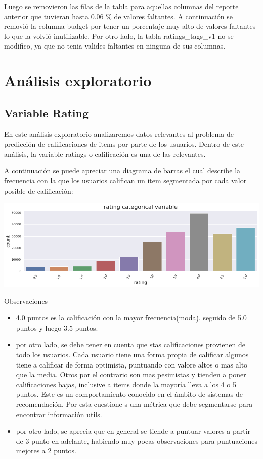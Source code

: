 \documentclass[11pt,a4paper,twoside]{thesis}
\begin{document}
Luego se removieron las filas de la tabla para aquellas columnas del reporte anterior que tuvieran hasta 0.06 \% de valores faltantes. A continuación se removió la columna budget por tener un porcentaje muy alto de valores faltantes lo que la volvió inutilizable. Por otro lado, la tabla ratings\_tags\_v1 no se modifico, ya que no tenia valides faltantes en ninguna de sus columnas.


\clearpage
\section{Análisis exploratorio}


\subsection{Variable Rating}


En este análisis exploratorio analizaremos datos relevantes al problema de predicción de calificaciones de items por parte de los usuarios. Dentro de este análisis, la variable ratings o calificación es una de las relevantes.

A continuación se puede apreciar una diagrama de barras el cual describe la frecuencia con la que los usuarios califican un item segmentada por cada valor posible de calificación:

\begin{center}
	\includegraphics[width=15cm]{./images/rating-barplot.png}
\end{center}

\begin{description}
	\item[Observaciones]
\end{description}
\begin{itemize}
	\item 4.0 puntos es la calificación con la mayor frecuencia(moda), seguido de 5.0 puntos y luego 3.5 puntos.
	\item por otro lado, se debe tener en cuenta que stas calificaciones provienen de todo los usuarios. Cada usuario tiene una forma propia de calificar algunos tiene a calificar de forma optimista, puntuando con valore altos o mas alto que la media. Otros por el contrario son mas pesimistas y tienden a poner calificaciones bajas, inclusive a items donde la mayoría lleva a los 4 o 5 puntos. Este es un comportamiento conocido en el ámbito de sistemas de recomendación. Por esta cuestione s una métrica que debe segmentarse para encontrar información utils.
	\item por otro lado, se aprecia que en general se tiende a puntuar valores a partir de 3 punto en adelante, habiendo muy pocas observaciones para puntuaciones mejores a 2 puntos.
\end{itemize}
\end{document}
